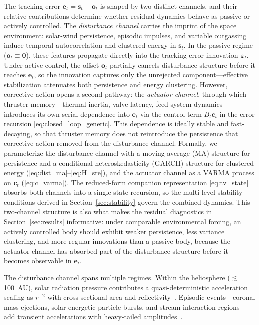 \documentclass{article}
\begin{document}
The tracking error $\mathbf{e}_t = \mathbf{s}_t - \mathbf{o}_t$ is shaped by two distinct channels, and their relative contributions determine whether residual dynamics behave as passive or actively controlled. The \emph{disturbance channel} carries the imprint of the space environment: solar-wind persistence, episodic impulses, and variable outgassing induce temporal autocorrelation and clustered energy in $\mathbf{s}_t$. In the passive regime ($\mathbf{o}_t\equiv\mathbf{0}$), these features propagate directly into the tracking-error innovation $\boldsymbol{\varepsilon}_t$. Under active control, the offset $\mathbf{o}_t$ partially cancels disturbance structure before it reaches $\mathbf{e}_t$, so the innovation captures only the unrejected component---effective stabilization attenuates both persistence and energy clustering. However, corrective action opens a second pathway: the \emph{actuator channel}, through which thruster memory---thermal inertia, valve latency, feed-system dynamics---introduces its own serial dependence into $\mathbf{e}_t$ via the control term $B_t\mathbf{c}_t$ in the error recursion \eqref{eq:closed_loop_generic}. This dependence is ideally stable and fast-decaying, so that thruster memory does not reintroduce the persistence that corrective action removed from the disturbance channel. Formally, we parameterize the disturbance channel with a moving-average (MA) structure for persistence and a conditional-heteroskedasticity (GARCH) structure for clustered energy (\eqref{eq:dist_ma}--\eqref{eq:H_sre}), and the actuator channel as a VARMA process on $\mathbf{c}_t$ (\eqref{eq:c_varma}). The reduced-form companion representation \eqref{eq:tv_state} absorbs both channels into a single state recursion, so the multi-level stability conditions derived in Section~\ref{sec:stability} govern the combined dynamics. This two-channel structure is also what makes the residual diagnostics in Section~\ref{sec:results} informative: under comparable environmental forcing, an actively controlled body should exhibit weaker persistence, less variance clustering, and more regular innovations than a passive body, because the actuator channel has absorbed part of the disturbance structure before it becomes observable in $\mathbf{e}_t$.

The disturbance channel spans multiple regimes. Within the heliosphere ($\lesssim$100~AU), solar radiation pressure contributes a quasi-deterministic acceleration scaling as $r^{-2}$ with cross-sectional area and reflectivity~\cite{wertz1999spacecraft}. Episodic events---coronal mass ejections, solar energetic particle bursts, and stream interaction regions---add transient accelerations with heavy-tailed amplitudes~\cite{richardson2018solar,tsurutani2003extreme}. 
\end{document}
